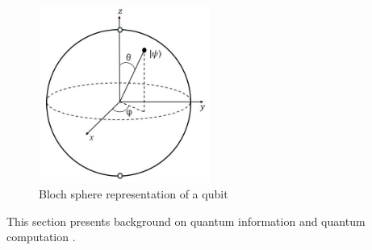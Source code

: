 \begin{figure} [H]
  \centering
  \includegraphics[width=0.5\textwidth]{images/bloch_sphere.jpg}
  \caption{Bloch sphere representation of a qubit}
  \label{fig:bloch_sphere}
\end{figure}





















This section presents background on quantum information and quantum computation \cite{nielsen2010quantum}.



